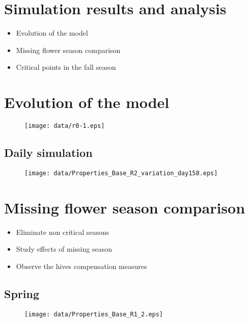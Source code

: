 \documentclass[
paper=128mm:96mm, %
fontsize=11pt, %
pagesize, %
parskip=half-, %
]{scrartcl} %
\theoremstyle{mythmstyle} %
\begin{document}
\section{Simulation results and analysis}

\begin{itemize}
\item Evolution of the model
\item Missing flower season comparison
\item Critical points in the fall season
\end{itemize}
\clearpage


\section{Evolution of the model}
\begin{figure}[H]
			\centering
			\texttt{[image: data/r0-1.eps]}
\end{figure}
\clearpage

\subsection{Daily simulation}
\begin{figure}[H]
			\centering
			\texttt{[image: data/Properties\_Base\_R2\_variation\_day158.eps]}
\end{figure}
\clearpage

\section{Missing flower season comparison}
\begin{itemize}
\item Eliminate non critical seasons
\item Study effects of missing season
\item Observe the hives compensation measures
\end{itemize}
\clearpage

\subsection{Spring}
\begin{figure}[H]
			\centering
			\texttt{[image: data/Properties\_Base\_R1\_2.eps]}
\end{figure}
\clearpage
\end{document}

